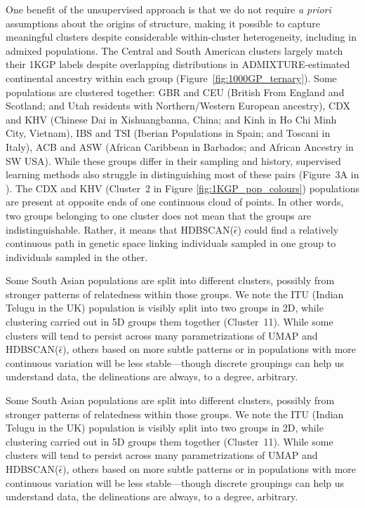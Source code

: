 One benefit of the unsupervised approach is that we do not require \emph{a priori} assumptions about the origins of structure, making it possible to capture meaningful clusters despite considerable within-cluster heterogeneity, including in admixed populations. The Central and South American clusters largely match their 1KGP labels despite overlapping distributions in ADMIXTURE-estimated continental ancestry within each group (Figure~\ref{fig:1000GP_ternary}). Some populations are clustered together: GBR and CEU (British From England and Scotland; and Utah residents with Northern/Western European ancestry), CDX and KHV (Chinese Dai in Xishuangbanna, China; and Kinh in Ho Chi Minh City, Vietnam), IBS and TSI (Iberian Populations in Spain; and Toscani in Italy), ACB and ASW (African Caribbean in Barbados; and African Ancestry in SW USA). While these groups differ in their sampling and history, supervised learning methods also struggle in distinguishing most of these pairs  (Figure~3A in \citep{romero_diet_2017}). The CDX and KHV (Cluster~2 in Figure \ref{fig:1KGP_pop_colours}) populations are present at opposite ends of one continuous cloud of points. In other words, two groups belonging to one cluster does not mean that the groups are indistinguishable.  Rather, it means that HDBSCAN($\hat{\epsilon}$) could find a relatively continuous path in genetic space linking individuals sampled in one group to individuals sampled in the other. 

Some South Asian populations are split into different clusters, possibly from stronger patterns of relatedness within those groups\citep{diaz-papkovich_umap_2019,reich_reconstructing_2009}. We note the ITU (Indian Telugu in the UK) population is visibly split into two groups in 2D, while clustering carried out in 5D groups them together (Cluster~11). While some clusters will tend to persist across many parametrizations of UMAP and HDBSCAN($\hat{\epsilon}$), others based on more subtle patterns or in populations with more continuous variation will be less stable---though discrete groupings can help us understand data, the delineations are always, to a degree, arbitrary.

Some South Asian populations are split into different clusters, possibly from stronger patterns of relatedness within those groups\citep{diaz-papkovich_umap_2019,reich_reconstructing_2009}. We note the ITU (Indian Telugu in the UK) population is visibly split into two groups in 2D, while clustering carried out in 5D groups them together (Cluster~11). While some clusters will tend to persist across many parametrizations of UMAP and HDBSCAN($\hat{\epsilon}$), others based on more subtle patterns or in populations with more continuous variation will be less stable---though discrete groupings can help us understand data, the delineations are always, to a degree, arbitrary.

